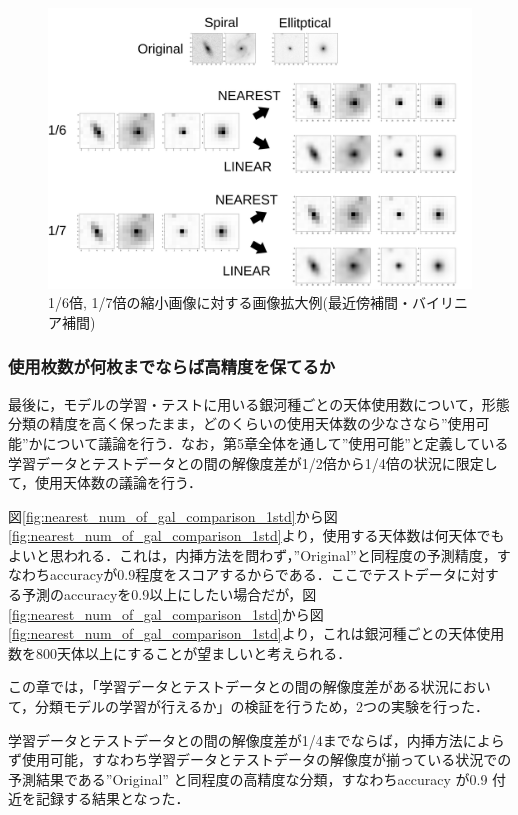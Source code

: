 \documentclass[a4j, 11pt]{jreport}
\begin{document}
\begin{figure}[htbp]
 \centering
 \includegraphics[width=1.0\hsize, keepaspectratio]{images/5syou/syuron_5syou_kakudai/ver1/5syou_giron_1_6and1_7.png}
 \caption{1/6倍, 1/7倍の縮小画像に対する画像拡大例(最近傍補間・バイリニア補間)}
 \label{fig:1_6and1_7}
\end{figure}


\subsubsection{使用枚数が何枚までならば高精度を保てるか}
最後に，モデルの学習・テストに用いる銀河種ごとの天体使用数について，形態分類の精度を高く保ったまま，どのくらいの使用天体数の少なさなら''使用可能''かについて議論を行う．なお，第5章全体を通して''使用可能''と定義している学習データとテストデータとの間の解像度差が1/2倍から1/4倍の状況に限定して，使用天体数の議論を行う．

図\ref{fig:nearest_num_of_gal_comparison_1std}から図\ref{fig:nearest_num_of_gal_comparison_1std}より，使用する天体数は何天体でもよいと思われる．これは，内挿方法を問わず，''Original''と同程度の予測精度，すなわちaccuracyが0.9程度をスコアするからである．ここでテストデータに対する予測のaccuracyを0.9以上にしたい場合だが，図\ref{fig:nearest_num_of_gal_comparison_1std}から図\ref{fig:nearest_num_of_gal_comparison_1std}より，これは銀河種ごとの天体使用数を800天体以上にすることが望ましいと考えられる．

この章では，「学習データとテストデータとの間の解像度差がある状況において，分類モデルの学習が行えるか」の検証を行うため，2つの実験を行った．

学習データとテストデータとの間の解像度差が1/4までならば，内挿方法によらず使用可能，すなわち学習データとテストデータの解像度が揃っている状況での予測結果である”Original” と同程度の高精度な分類，すなわちaccuracy が0.9 付近を記録する結果となった．
\end{document}
